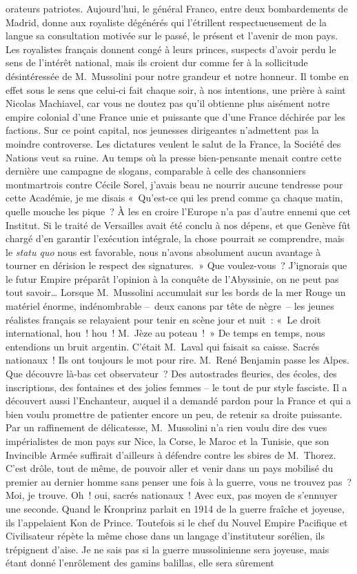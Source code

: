 \documentclass[french,twoside]{book} %
\begin{document}
orateurs patriotes. Aujourd’hui, le général Franco, entre deux bombardements de Madrid, donne aux royaliste dégénérés qui l’étrillent respectueusement de la langue sa consultation motivée sur le passé, le présent et l’avenir de mon pays. Les royalistes français donnent congé à leurs princes, suspects d’avoir perdu le sens de l’intérêt national, mais ils croient dur comme fer à la sollicitude désintéressée de M. Mussolini pour notre grandeur et notre honneur. Il tombe en effet sous le sens que celui-ci fait chaque soir, à nos intentions, une prière à saint Nicolas Machiavel, car vous ne doutez pas qu’il obtienne plus aisément notre empire colonial d’une France unie et puissante que d’une France déchirée par les factions. Sur ce point capital, nos jeunesses dirigeantes n’admettent pas la moindre controverse. Les dictatures veulent le salut de la France, la Société des Nations veut sa ruine. Au temps où la presse bien-pensante menait contre cette dernière une campagne de slogans, comparable à celle des chansonniers montmartrois contre Cécile Sorel, j’avais beau ne nourrir aucune tendresse pour cette Académie, je me disais « Qu’est-ce qui les prend comme ça chaque matin, quelle mouche les pique ? À les en croire l’Europe n’a pas d’autre ennemi que cet Institut. Si le traité de Versailles avait été conclu à nos dépens, et que Genève fût chargé d’en garantir l’exécution intégrale, la chose pourrait se comprendre, mais le \emph{statu quo} nous est favorable, nous n’avons absolument aucun avantage à tourner en dérision le respect des signatures. » Que voulez-vous ? J’ignorais que le futur Empire préparât l’opinion à la conquête de l’Abyssinie, on ne peut pas tout savoir… Lorsque M. Mussolini accumulait sur les bords de la mer Rouge un matériel énorme, indénombrable – deux canons par tête de nègre – les jeunes réalistes français se relayaient pour tenir en scène jour et nuit : « Le droit international, hou ! hou ! M. Jèze au poteau ! » De temps en temps, nous entendions un bruit argentin. C’était M. Laval qui faisait sa caisse. Sacrés nationaux ! Ils ont toujours le mot pour rire. M. René Benjamin passe les Alpes. Que découvre là-bas cet observateur ? Des autostrades fleuries, des écoles, des inscriptions, des fontaines et des jolies femmes – le tout de pur style fasciste. Il a découvert aussi l’Enchanteur, auquel il a demandé pardon pour la France et qui a bien voulu promettre de patienter encore un peu, de retenir sa droite puissante. Par un raffinement de délicatesse, M. Mussolini n’a rien voulu dire des vues impérialistes de mon pays sur Nice, la Corse, le Maroc et la Tunisie, que son Invincible Armée suffirait d’ailleurs à défendre contre les sbires de M. Thorez. C’est drôle, tout de même, de pouvoir aller et venir dans un pays mobilisé du premier au dernier homme sans penser une fois à la guerre, vous ne trouvez pas ? Moi, je trouve. Oh ! oui, sacrés nationaux ! Avec eux, pas moyen de s’ennuyer une seconde. Quand le Kronprinz parlait en 1914 de la guerre fraîche et joyeuse, ils l’appelaient Kon de Prince. Toutefois si le chef du Nouvel Empire Pacifique et Civilisateur répète la même chose dans un langage d’instituteur sorélien, ils trépignent d’aise. Je ne sais pas si la guerre mussolinienne sera joyeuse, mais étant donné l’enrôlement des gamins balillas, elle sera sûrement 
\end{document}
